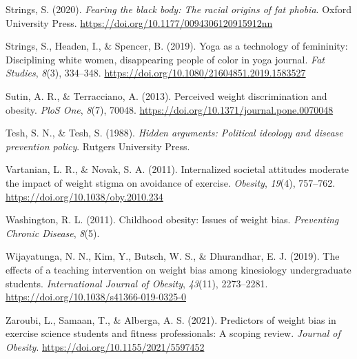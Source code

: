 \documentclass[
  jou,
  longtable,
  nolmodern,
  notxfonts,
  notimes,
  colorlinks=true,linkcolor=blue,citecolor=blue,urlcolor=blue]{apa7}
\newlength{\cslhangindent}
\newenvironment{CSLReferences}[2] %
 {\begin{list}{}{%
  \setlength{\itemindent}{0pt}
  \setlength{\leftmargin}{0pt}
  \setlength{\parsep}{0pt}
  \ifodd #1
   \setlength{\leftmargin}{\cslhangindent}
   \setlength{\itemindent}{-1\cslhangindent}
  \fi
  \setlength{\itemsep}{#2\baselineskip}}}
 {\end{list}}
\begin{document}
\begin{CSLReferences}{1}{0}
Strings, S. (2020). \emph{Fearing the black body: The racial origins of
fat phobia}. Oxford University Press.
\url{https://doi.org/10.1177/0094306120915912nn}

Strings, S., Headen, I., \& Spencer, B. (2019). Yoga as a technology of
femininity: Disciplining white women, disappearing people of color in
yoga journal. \emph{Fat Studies}, \emph{8}(3), 334--348.
\url{https://doi.org/10.1080/21604851.2019.1583527}

Sutin, A. R., \& Terracciano, A. (2013). Perceived weight discrimination
and obesity. \emph{PloS One}, \emph{8}(7), 70048.
\url{https://doi.org/10.1371/journal.pone.0070048}

Tesh, S. N., \& Tesh, S. (1988). \emph{Hidden arguments: Political
ideology and disease prevention policy}. Rutgers University Press.

Vartanian, L. R., \& Novak, S. A. (2011). Internalized societal
attitudes moderate the impact of weight stigma on avoidance of exercise.
\emph{Obesity}, \emph{19}(4), 757--762.
\url{https://doi.org/10.1038/oby.2010.234}

Washington, R. L. (2011). Childhood obesity: Issues of weight bias.
\emph{Preventing Chronic Disease}, \emph{8}(5).

Wijayatunga, N. N., Kim, Y., Butsch, W. S., \& Dhurandhar, E. J. (2019).
The effects of a teaching intervention on weight bias among kinesiology
undergraduate students. \emph{International Journal of Obesity},
\emph{43}(11), 2273--2281.
\url{https://doi.org/10.1038/s41366-019-0325-0}

Zaroubi, L., Samaan, T., \& Alberga, A. S. (2021). Predictors of weight
bias in exercise science students and fitness professionals: A scoping
review. \emph{Journal of Obesity}.
\url{https://doi.org/10.1155/2021/5597452}

\end{CSLReferences}
\end{document}
